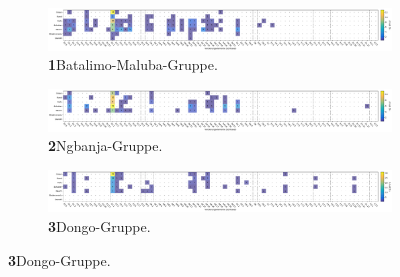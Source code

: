 \begin{figure}


\begin{subfigure}{\textwidth}
	\centering
	\includegraphics[width=\textwidth]{fig/BTM_Verzierungselmente.pdf}
	\caption*{\textbf{1}\hspace{1em}Batalimo-Maluba-Gruppe. \vspace{\baselineskip}}
	\label{fig:BatMLB_Verz}
\end{subfigure}

\begin{subfigure}{\textwidth}
	\centering
	\includegraphics[width=\textwidth]{fig/NGB_Verzierungselmente.pdf}
	\caption*{\textbf{2}\hspace{1em}\mbox{Ngbanja}-Gruppe. \vspace{\baselineskip}}
	\label{fig:NGB_Verz}
\end{subfigure}

\begin{subfigure}{\textwidth}
	\centering
	\includegraphics[width=\textwidth]{fig/DON_Verzierungselmente.pdf}
	\caption*{\textbf{3}\hspace{1em}Dongo-Gruppe. \vspace{\baselineskip}}
	\label{fig:DON_Verz}
\end{subfigure}

\end{figure}

